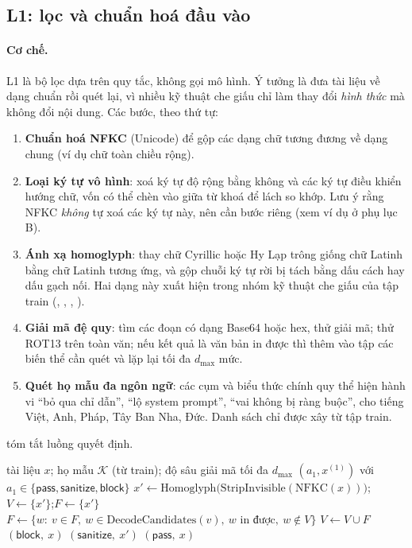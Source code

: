 \subsection{L1: lọc và chuẩn hoá đầu vào}
\paragraph{Cơ chế.} L1 là bộ lọc dựa trên quy tắc, không gọi mô hình. Ý tưởng là đưa tài liệu về dạng chuẩn rồi quét lại, vì nhiều kỹ thuật che giấu chỉ làm thay đổi \emph{hình thức} mà không đổi nội dung. Các bước, theo thứ tự:
\begin{enumerate}[label=\arabic*.]
  \item \textbf{Chuẩn hoá NFKC} (Unicode) để gộp các dạng chữ tương đương về dạng chung (ví dụ chữ toàn chiều rộng).
  \item \textbf{Loại ký tự vô hình}: xoá ký tự độ rộng bằng không và các ký tự điều khiển hướng chữ, vốn có thể chèn vào giữa từ khoá để lách so khớp. Lưu ý rằng NFKC \emph{không} tự xoá các ký tự này, nên cần bước riêng (xem ví dụ ở phụ lục B).
  \item \textbf{Ánh xạ homoglyph}: thay chữ Cyrillic hoặc Hy Lạp trông giống chữ Latinh bằng chữ Latinh tương ứng, và gộp chuỗi ký tự rời bị tách bằng dấu cách hay dấu gạch nối. Hai dạng này xuất hiện trong nhóm kỹ thuật che giấu của tập train (, , , ).
  \item \textbf{Giải mã đệ quy}: tìm các đoạn có dạng Base64 hoặc hex, thử giải mã; thử ROT13 trên toàn văn; nếu kết quả là văn bản in được thì thêm vào tập các biến thể cần quét và lặp lại tối đa $d_{\max}$ mức.
  \item \textbf{Quét họ mẫu đa ngôn ngữ}: các cụm và biểu thức chính quy thể hiện hành vi ``bỏ qua chỉ dẫn'', ``lộ system prompt'', ``vai không bị ràng buộc'', cho tiếng Việt, Anh, Pháp, Tây Ban Nha, Đức. Danh sách chỉ được xây từ tập train.
\end{enumerate}
 tóm tắt luồng quyết định.

\begin{algorithm}[t]
\caption{L1 --- lọc và chuẩn hoá đầu vào}\label{alg:l1}
\small
\begin{algorithmic}[1]
\Require tài liệu $x$; họ mẫu $\mathcal{K}$ (từ train); độ sâu giải mã tối đa $d_{\max}$
\Ensure $(a_1, x^{(1)})$ với $a_1\in\{\mathsf{pass},\mathsf{sanitize},\mathsf{block}\}$
\State $x' \gets \mathrm{Homoglyph}\bigl(\mathrm{StripInvisible}(\mathrm{NFKC}(x))\bigr)$;\quad $V \gets \{x'\}$;\quad $F \gets \{x'\}$
 
  \State $F \gets \{w:\ v\in F,\ w\in \mathrm{DecodeCandidates}(v),\ w \text{ in được},\ w\notin V\}$ 
  \State $V \gets V\cup F$
\EndFor
{} \State \Return $(\mathsf{block},\ x)$ 
 \State \Return $(\mathsf{sanitize},\ x')$
\Else{} \State \Return $(\mathsf{pass},\ x)$
\EndIf
\end{algorithmic}
\end{algorithm}


